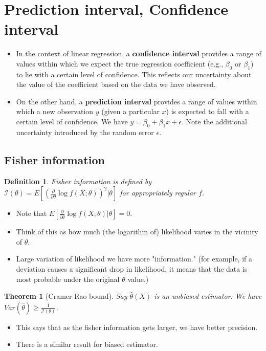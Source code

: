 \documentclass[11pt,reqno]{amsart}
\newtheorem{theorem}{Theorem}
\newtheorem{definition}{Definition}
\theoremstyle{remark}
\begin{document}
\section{Prediction interval, Confidence interval}
\begin{itemize}
\item In the context of linear regression, a \textbf{confidence interval} provides a range of values within which we expect the true regression coefficient (e.g., $ \beta_0 $ or $ \beta_1 $) to lie with a certain level of confidence. This reflects our uncertainty about the 
value of the coefficient based on the data we have observed.
\item On the other hand, a \textbf{prediction interval} provides a range of values within which a new observation $ y $ (given a particular $ x $) is expected to fall with a certain level of confidence.
We have $y=\beta_0+\beta_1 x+\epsilon$. Note the additional uncertainty introduced by the random error $\epsilon$.
\end{itemize}

\subsection{Fisher information}
\begin{definition}
Fisher information is defined by $\mathcal{I}(\theta)=E[(\frac \partial{\partial\theta}\log f(X;\theta))^2|\theta]$ for appropriately regular $f$.
\end{definition}

\begin{itemize}
\item Note that $E[\frac{\partial}{\partial\theta}\log f(X;\theta)|\theta]=0$.
\item Think of this as how much (the logarithm of) likelihood varies in the vicinity of $\theta$.
\item Large variation of likelihood we have more "information." (for example, if a deviation causes a significant drop in likelihood, 
it means that the data is most probable under the original $\theta$ value.)
\end{itemize}

\begin{theorem} [Cramer-Rao bound]
Say $\hat\theta(X)$ is an unbiased estimator. We have $Var(\hat\theta)\geq \frac 1{\mathcal{I}(\theta)}$.
\end{theorem}

\begin{itemize}
\item This says that as the fisher information gets larger, we have better precision.
\item There is a similar result for biased estimator.
\end{itemize}
\end{document}
